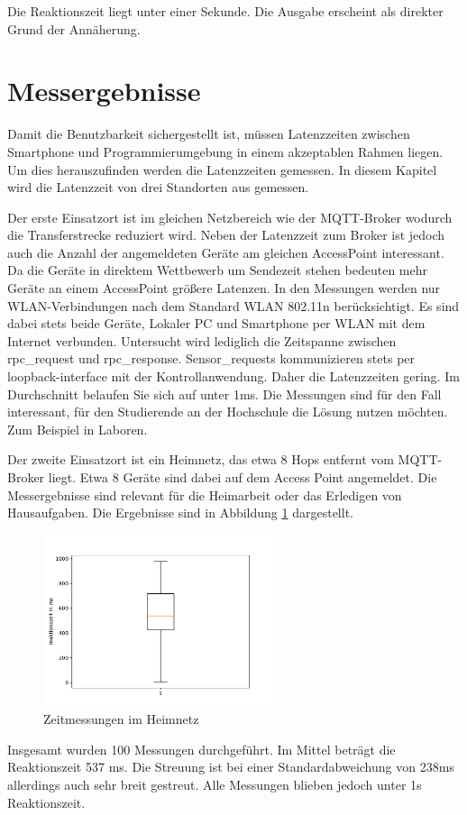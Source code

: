 \documentclass[11pt,a4paper]{report}
\begin{document}
Die Reaktionszeit liegt unter einer Sekunde.
Die Ausgabe erscheint als direkter Grund der Annäherung.

\section{Messergebnisse}
Damit die Benutzbarkeit sichergestellt ist, müssen Latenzzeiten zwischen Smartphone und Programmierumgebung in einem akzeptablen Rahmen liegen.
Um dies herauszufinden werden die Latenzzeiten gemessen.
In diesem Kapitel wird die Latenzzeit von drei Standorten aus gemessen.

Der erste Einsatzort ist im gleichen Netzbereich wie der MQTT-Broker wodurch die Transferstrecke reduziert wird.
Neben der Latenzzeit zum Broker ist jedoch auch die Anzahl der angemeldeten Geräte am gleichen AccessPoint interessant.
Da die Geräte in direktem Wettbewerb um Sendezeit stehen bedeuten mehr Geräte an einem AccessPoint größere Latenzen.
In den Messungen werden nur WLAN-Verbindungen nach dem Standard WLAN 802.11n berücksichtigt.
Es sind dabei stets beide Geräte, Lokaler PC und Smartphone per WLAN mit dem Internet verbunden.
Untersucht wird lediglich die Zeitspanne zwischen rpc\_request und rpc\_response.
Sensor\_requests kommunizieren stets per loopback-interface mit der Kontrollanwendung.
Daher die Latenzzeiten gering.
Im Durchschnitt belaufen Sie sich auf unter 1ms.
Die Messungen sind  für den Fall interessant, für den Studierende an der Hochschule die Lösung nutzen möchten.
Zum Beispiel in Laboren.

Der zweite Einsatzort ist ein Heimnetz, das etwa 8 Hops entfernt vom MQTT-Broker liegt.
Etwa 8 Geräte sind dabei auf dem Access Point angemeldet.
Die Messergebnisse sind relevant für die Heimarbeit oder das Erledigen von Hausaufgaben.
Die Ergebnisse sind in Abbildung \ref{fig:measure_home} dargestellt.
\begin{figure}[htbp]
  \centering
  \includegraphics[width=0.6\textwidth]{images/timing_at_home}
  \caption{Zeitmessungen im Heimnetz}
  \label{fig:measure_home}
\end{figure}
Insgesamt wurden 100 Messungen durchgeführt.
Im Mittel beträgt die Reaktionszeit 537 ms.
Die Streuung ist bei einer Standardabweichung von 238ms allerdings auch sehr breit gestreut.
Alle Messungen blieben jedoch unter 1s Reaktionszeit.
\end{document}

